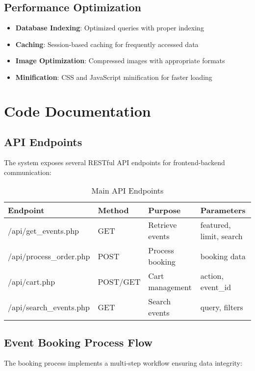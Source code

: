 \documentclass[12pt,a4paper]{article}
\begin{document}
\subsection{Performance Optimization}
\begin{itemize}
    \item \textbf{Database Indexing}: Optimized queries with proper indexing
    \item \textbf{Caching}: Session-based caching for frequently accessed data
    \item \textbf{Image Optimization}: Compressed images with appropriate formats
    \item \textbf{Minification}: CSS and JavaScript minification for faster loading
\end{itemize}

\section{Code Documentation}

\subsection{API Endpoints}

The system exposes several RESTful API endpoints for frontend-backend communication:

\begin{table}[H]
\centering
\begin{tabular}{|l|l|l|l|}
\hline
\textbf{Endpoint} & \textbf{Method} & \textbf{Purpose} & \textbf{Parameters} \\
\hline
/api/get\_events.php & GET & Retrieve events & featured, limit, search \\
/api/process\_order.php & POST & Process booking & booking data \\
/api/cart.php & POST/GET & Cart management & action, event\_id \\
/api/search\_events.php & GET & Search events & query, filters \\
\hline
\end{tabular}
\caption{Main API Endpoints}
\end{table}

\subsection{Event Booking Process Flow}

The booking process implements a multi-step workflow ensuring data integrity:
\end{document}
